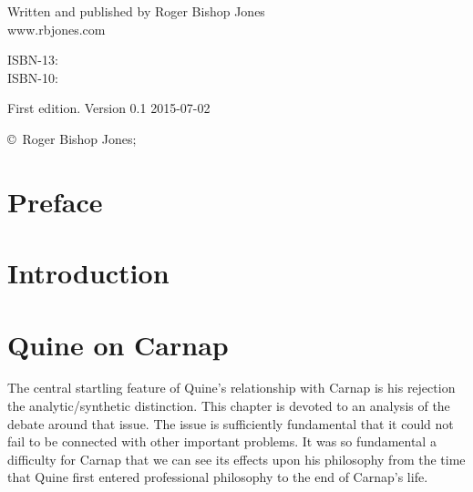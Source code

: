 \begin{titlepage}
\maketitle

\hspace{2in}

\vfill

\begin{centering}

{\small

Written and published by Roger Bishop Jones\\
www.rbjones.com\\

\vspace{0.2in}

ISBN-13: \\
ISBN-10: 

\vspace{0.2in}

}%
{\scriptsize

First edition. \hfil Version 0.1 \hfil 2015-07-02

\vspace{0.2in}

\copyright\ Roger Bishop Jones;

}%

\end{centering}

\thispagestyle{empty}

\end{titlepage}

{\parskip=0pt\tableofcontents}


\chapter*{Preface}\label{Preface}

\mainmatter

\chapter{Introduction}

\chapter{Quine on Carnap}

The central startling feature of Quine's relationship with
Carnap is his rejection the analytic/synthetic distinction.
This chapter is devoted to an analysis of the debate around
that issue.
The issue is sufficiently fundamental that it could not fail
to be connected with other important problems.
It was so fundamental a difficulty for Carnap that we can
see its effects upon his philosophy from the time that Quine
first entered professional philosophy to the end of Carnap's
life.

